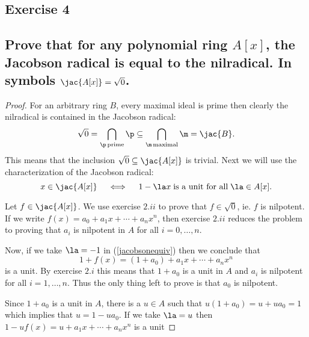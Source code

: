 \subsection*{Exercise 4}
\subsection*{%
Prove that for any polynomial ring $A[x]$, the Jacobson radical is equal to the nilradical.
In symbols $\jac{A[x]}=\sqrt{0}$.
} 

\begin{proof}%
For an arbitrary ring $B$, every maximal ideal is prime then clearly the nilradical is contained
in the Jacobson radical:
\[
	\sqrt{0}=\bigcap_{\p\,\text{prime}}\p \subseteq \bigcap_{\m\,\text{maximal}}\m=%
	\jac{B}.
\]
This means that the inclusion $\sqrt{0}\subseteq\jac{A[x]}$ is trivial.
Next we will use the characterization of the Jacobson radical:
\begin{equation}\label{jacobsonequiv}
	x\in\jac{A[x]} \quad\iff\quad 1-\la x\;\text{is a unit for all}\; \la\in A[x].%
\end{equation}

Let $f\in\jac{A[x]}$. We use exercise $2.ii$ to prove that $f\in\sqrt{0}$, ie. $f$ is nilpotent.
If we write $f(x)=a_0+a_1 x+\cdots +a_n x^n$, then exercise $2.ii$ reduces the problem to
proving that $a_i$ is nilpotent in $A$ for all $i=0,\ldots,n$.

Now, if we take $\la=-1$ in (\ref{jacobsonequiv}) then we conclude that
\[
	1+f(x)=(1+a_0)+a_1 x+\cdots +a_n x^n
\]
is a unit. By exercise $2.i$ this means that $1+a_0$ is a unit in $A$ and $a_i$ is nilpotent
for all $i=1,\ldots,n$. Thus the only thing left to prove is that $a_0$ is nilpotent.

Since $1+a_0$ is a unit in $A$, there is a $u\in A$ such that $u(1+a_0)=u+ua_0=1$ which implies
that $u=1-ua_0$. If we take $\la=u$ then $1-uf(x)=u+a_1x+\cdots+a_n x^n$ is a unit

%
\end{proof}%

